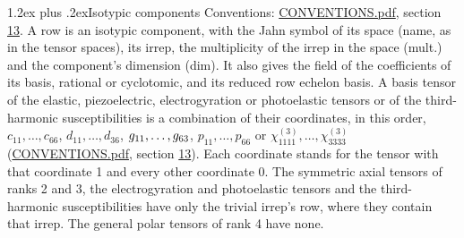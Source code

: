 \documentclass[10pt,a4paper]{article}
\makeatletter
\renewcommand\section{\@startsection{section}{1}{\z@}{-3ex plus -1ex minus -.2ex}%
  {1.2ex plus .2ex}{\normalfont\large\sffamily\bfseries\color{parttitle}}}
\numberwithin{equation}{section}
\makeatother
\begin{document}
\section{Isotypic components}\label{s:isotypic}
Conventions: \href{../../CONVENTIONS.pdf}{CONVENTIONS.pdf}, section \href{../../CONVENTIONS.pdf\#conv.13}{13}.
\leavevmode\label{n:head.multiplicity}A row is an isotypic component, with the Jahn symbol of its space (name, as in the tensor spaces), its irrep, the multiplicity of the irrep in the space (mult.) and the component's dimension (dim). \label{n:head.coefficients}\label{n:head.basis}It also gives the field of the coefficients of its basis, rational or cyclotomic, and its reduced row echelon basis. \label{n:matrix.elastic}\label{n:matrix.piezoelectric}\label{n:matrix.electrogyration}\label{n:matrix.photoelastic}\label{n:matrix.susceptibility}A basis tensor of the elastic, piezoelectric, electrogyration or photoelastic tensors or of the third-harmonic susceptibilities is a combination of their coordinates, in this order, $c_{11}, \dots, c_{66}$, $d_{11}, \dots, d_{36}$, $\mathnormal{g}_{11}, \dots, \mathnormal{g}_{63}$, $p_{11}, \dots, p_{66}$ or $\chi^{(3)}_{1111}, \dots, \chi^{(3)}_{3333}$ (\href{../../CONVENTIONS.pdf}{CONVENTIONS.pdf}, section \href{../../CONVENTIONS.pdf\#conv.13}{13}). Each coordinate stands for the tensor with that coordinate 1 and every other coordinate 0. The symmetric axial tensors of ranks 2 and 3, the electrogyration and photoelastic tensors and the third-harmonic susceptibilities have only the trivial irrep's row, where they contain that irrep. The general polar tensors of rank 4 have none.
\end{document}
